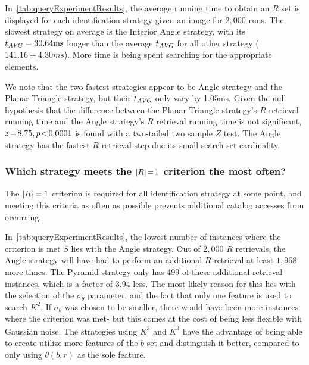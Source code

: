 In~\autoref{tab:queryExperimentResults}, the average running time to obtain an $R$ set is displayed for each
identification strategy given an image for $2{,}000$ runs.
The slowest strategy on average is the Interior Angle strategy, with its $t_{\AVG} = 30.64 \si{ms}$ longer than the
average $t_{\AVG}$ for all other strategy ($141.16 \pm 4.30 \si{ms}$).
More time is being spent searching for the appropriate elements.

We note that the two fastest strategies appear to be Angle strategy and the Planar Triangle strategy, but their
$t_\AVG$ only vary by 1.05ms.
Given the null hypothesis that the difference between the Planar Triangle strategy's $R$ retrieval running time and the
Angle strategy's $R$ retrieval running time is not significant, $z \seq 8.75, p\!<\!0.0001$ is found with a two-tailed
two sample $Z$ test.
The Angle strategy has the fastest $R$ retrieval step due its small search set cardinality.

\subsubsection{Which strategy meets the $\abs{R} \seq 1$ criterion the most often?}
The $\abs{R} = 1$ criterion is required for all identification strategy at some point, and meeting this criteria as
often as possible prevents additional catalog accesses from occurring.

In~\autoref{tab:queryExperimentResults}, the lowest number of instances where the criterion is met $S$ lies with the
Angle strategy.
Out of $2{,}000$ $R$ retrievals, the Angle strategy will have had to perform an additional $R$ retrieval at least
$1{,}968$ more times.
The Pyramid strategy only has 499 of these additional retrieval instances, which is a factor of 3.94 less.
The most likely reason for this lies with the selection of the $\sigma_\theta$ parameter, and the fact that only one
feature is used to search $K^2$.
If $\sigma_\theta$ was chosen to be smaller, there would have been more instances where the criterion was met- but
this comes at the cost of being less flexible with Gaussian noise.
The strategies using $K^3$ and $\bar{K^3}$ have the advantage of being able to create utilize more features of the
$b$ set and distinguish it better, compared to only using $\theta(b, r)$ as the sole feature.

